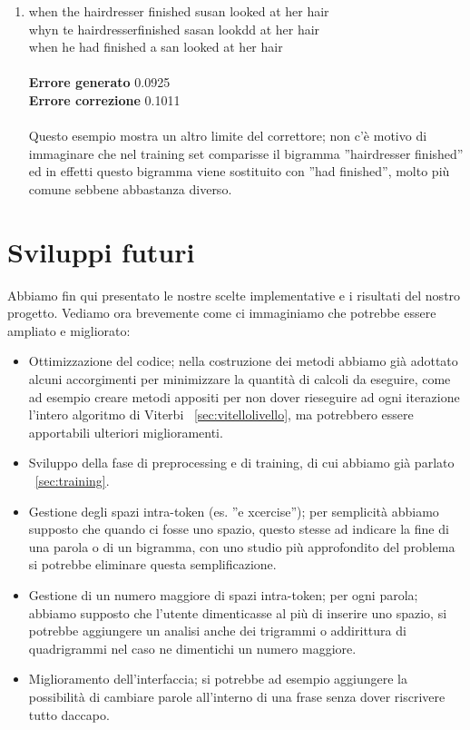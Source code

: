 \begin{enumerate}
\item when the hairdresser finished  susan looked at her hair\\
whyn te hairdresserfinished sasan lookdd at her hair\\
when he had finished a san looked at her hair\\
\\
\textbf{Errore generato} 0.0925\\
\textbf{Errore correzione} 0.1011\\
\\
Questo esempio mostra un altro limite del correttore; non c'è motivo di immaginare che nel training set comparisse il bigramma ''hairdresser finished'' ed in effetti questo bigramma viene sostituito con ''had finished'', molto più comune sebbene abbastanza diverso.
\end{enumerate}

\section{Sviluppi futuri}
Abbiamo fin qui presentato le nostre scelte implementative e i risultati del nostro progetto. Vediamo ora brevemente come ci immaginiamo che potrebbe essere ampliato e migliorato:
\begin{itemize}
\item Ottimizzazione del codice; nella costruzione dei metodi abbiamo già adottato alcuni accorgimenti per minimizzare la quantità di calcoli da eseguire, come ad esempio creare metodi appositi per non dover rieseguire ad ogni iterazione l'intero algoritmo di Viterbi ~\ref{sec:vitellolivello}, ma potrebbero essere apportabili ulteriori miglioramenti.
\item Sviluppo della fase di preprocessing e di training, di cui abbiamo già parlato ~\ref{sec:training}.
\item Gestione degli spazi intra-token (es. ''e xcercise''); per semplicità abbiamo supposto che quando ci fosse uno spazio, questo stesse ad indicare la fine di una parola o di un bigramma, con uno studio più approfondito del problema si potrebbe eliminare questa semplificazione.
\item Gestione di un numero maggiore di spazi intra-token; per ogni parola; abbiamo supposto che l'utente dimenticasse al più di inserire uno spazio, si potrebbe aggiungere un analisi anche dei trigrammi o addirittura di quadrigrammi nel caso ne dimentichi un numero maggiore.
\item Miglioramento dell'interfaccia; si potrebbe ad esempio aggiungere la possibilità di cambiare parole all'interno di una frase senza dover riscrivere tutto daccapo.    
\end{itemize}